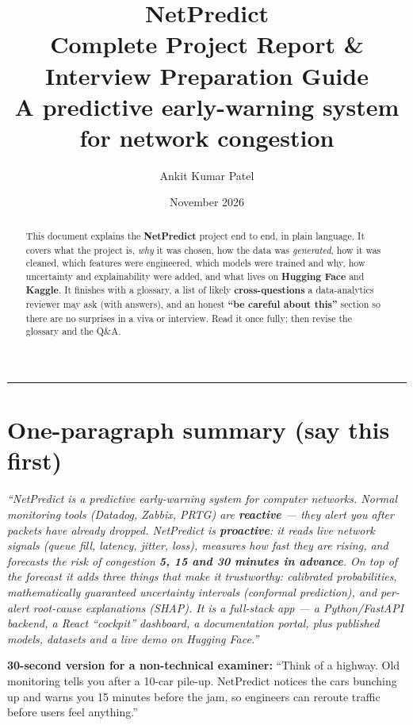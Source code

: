 \documentclass[11pt,a4paper]{article}
\title{\vspace{-1.2cm}\textbf{\Large NetPredict}\\[2pt]
\large Complete Project Report \& Interview Preparation Guide\\[6pt]
\normalsize A predictive early-warning system for network congestion}
\author{Ankit Kumar Patel}
\date{November 2026}
\newcommand{\note}[1]{%
  \par\vspace{3pt}\noindent
  \colorbox{soft}{\parbox{\dimexpr\linewidth-2\fboxsep}{\small #1}}%
  \par\vspace{3pt}}
\begin{document}
\maketitle
\thispagestyle{fancy}

\begin{abstract}
\noindent This document explains the \textbf{NetPredict} project end to end, in plain language.
It covers what the project is, \emph{why} it was chosen, how the data was \emph{generated},
how it was cleaned, which features were engineered, which models were trained and why,
how uncertainty and explainability were added, and what lives on \textbf{Hugging Face} and
\textbf{Kaggle}. It finishes with a glossary, a list of likely \textbf{cross-questions} a data-analytics
reviewer may ask (with answers), and an honest \textbf{``be careful about this''} section so there are
no surprises in a viva or interview. Read it once fully; then revise the glossary and the Q\&A.
\end{abstract}

\tableofcontents
\vspace{6pt}
\hrule

\section{One-paragraph summary (say this first)}
\noindent\emph{``NetPredict is a predictive early-warning system for computer networks. Normal monitoring
tools (Datadog, Zabbix, PRTG) are \textbf{reactive} --- they alert you \emph{after} packets have already
dropped. NetPredict is \textbf{proactive}: it reads live network signals (queue fill, latency, jitter,
loss), measures how fast they are rising, and forecasts the risk of congestion \textbf{5, 15 and 30 minutes
in advance}. On top of the forecast it adds three things that make it trustworthy: calibrated probabilities,
mathematically guaranteed uncertainty intervals (conformal prediction), and per-alert root-cause
explanations (SHAP). It is a full-stack app --- a Python/FastAPI backend, a React ``cockpit'' dashboard,
a documentation portal, plus published models, datasets and a live demo on Hugging Face.''}

\note{\textbf{30-second version for a non-technical examiner:} ``Think of a highway. Old monitoring tells
you after a 10-car pile-up. NetPredict notices the cars bunching up and warns you 15 minutes before the jam,
so engineers can reroute traffic before users feel anything.''}
\end{document}
